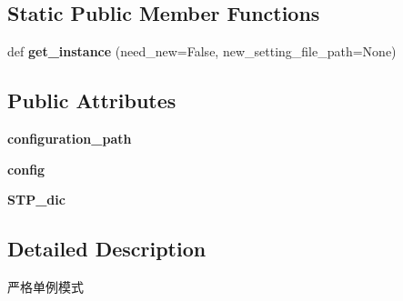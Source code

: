 \subsection*{Static Public Member Functions}
\begin{DoxyCompactItemize}
\item 
\mbox{\label{classMIS_1_1Muon__Imaging__Algorithm_1_1InvDataFactory_1_1Setting_1_1Setting_a2b8e83c53555c14746b070ce1ff180de}} 
def {\bfseries get\+\_\+instance} (need\+\_\+new=False, new\+\_\+setting\+\_\+file\+\_\+path=None)
\end{DoxyCompactItemize}
\subsection*{Public Attributes}
\begin{DoxyCompactItemize}
\item 
\mbox{\label{classMIS_1_1Muon__Imaging__Algorithm_1_1InvDataFactory_1_1Setting_1_1Setting_a73daf76a9a8c1a259df591f10a045541}} 
{\bfseries configuration\+\_\+path}
\item 
\mbox{\label{classMIS_1_1Muon__Imaging__Algorithm_1_1InvDataFactory_1_1Setting_1_1Setting_a3c0fe9307d14a09cda294e9cfa0f59f8}} 
{\bfseries config}
\item 
\mbox{\label{classMIS_1_1Muon__Imaging__Algorithm_1_1InvDataFactory_1_1Setting_1_1Setting_ae999ff5c4cd82520d6dcfb9e01bb5741}} 
{\bfseries S\+T\+P\+\_\+dic}
\end{DoxyCompactItemize}


\subsection{Detailed Description}
\begin{DoxyVerb}严格单例模式
\end{DoxyVerb}
 


